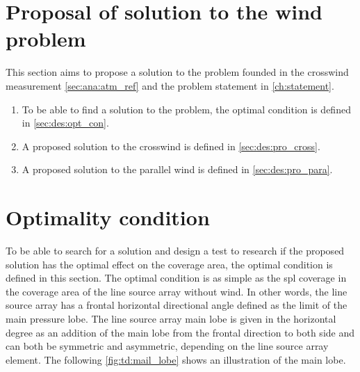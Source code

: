 \section{Proposal of solution to the wind problem}\label{sec:td:pro_sol_pro}

This section aims to propose a solution to the problem founded in the crosswind measurement \autoref{sec:ana:atm_ref} and the problem statement in \autoref{ch:statement}. 

\begin{enumerate}
\item To be able to find a solution to the problem, the optimal condition is defined in \autoref{sec:des:opt_con}.
\item A proposed solution to the crosswind is defined in \autoref{sec:des:pro_cross}.
\item A proposed solution to the parallel wind is defined in \autoref{sec:des:pro_para}.
\end{enumerate}





\section{Optimality condition}\label{sec:des:opt_con}

To be able to search for a solution and design a test to research if the proposed solution has the optimal effect on the coverage area, the optimal condition is defined in this section. The optimal condition is as simple as the \gls{spl} coverage in the coverage area of the line source array without wind. In other words, the line source array has a frontal horizontal directional angle defined as the  limit of the main pressure lobe. The line source array main lobe is given in the horizontal degree as an addition of the main lobe from the frontal direction to both side and can both be symmetric and asymmetric, depending on the line source array element. The following \autoref{fig:td:mail_lobe} shows an illustration of the main lobe. 


